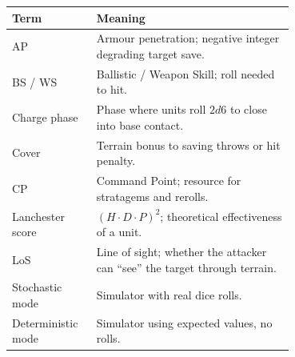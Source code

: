 \documentclass[11pt,a4paper]{article}
\begin{document}
\begin{tabular}{lp{0.7\linewidth}}
\toprule
Term & Meaning \\
\midrule
AP                & Armour penetration; negative integer degrading target save. \\
BS / WS           & Ballistic / Weapon Skill; roll needed to hit. \\
Charge phase      & Phase where units roll $2d6$ to close into base contact. \\
Cover             & Terrain bonus to saving throws or hit penalty. \\
CP                & Command Point; resource for stratagems and rerolls. \\
Lanchester score  & $(H \cdot D \cdot P)^2$; theoretical effectiveness of a unit. \\
LoS               & Line of sight; whether the attacker can ``see'' the target through terrain. \\
Stochastic mode   & Simulator with real dice rolls. \\
Deterministic mode& Simulator using expected values, no rolls. \\
\bottomrule
\end{tabular}
\end{document}
